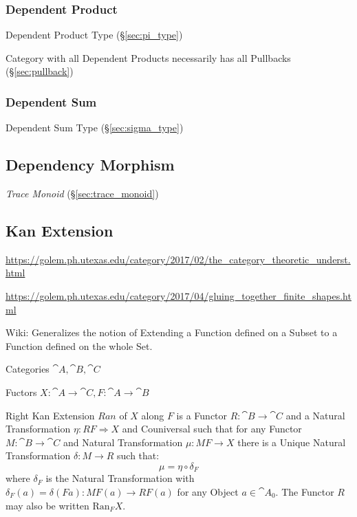 \subsubsection{Dependent Product}\label{sec:dependent_product}

Dependent Product Type (\S\ref{sec:pi_type})

Category with all Dependent Products necessarily has all Pullbacks
(\S\ref{sec:pullback})



\subsubsection{Dependent Sum}\label{sec:dependent_sum}

Dependent Sum Type (\S\ref{sec:sigma_type})



\subsection{Dependency Morphism}\label{sec:dependency_morphism}

\emph{Trace Monoid} (\S\ref{sec:trace_monoid})



\subsection{Kan Extension}\label{sec:kan_extension}

\url{https://golem.ph.utexas.edu/category/2017/02/the_category_theoretic_underst.html}

\url{https://golem.ph.utexas.edu/category/2017/04/gluing_together_finite_shapes.html}

Wiki: Generalizes the notion of Extending a Function defined on a
Subset to a Function defined on the whole Set.

Categories $\cat{A}, \cat{B}, \cat{C}$

Fuctors $X : \cat{A} \rightarrow \cat{C}, F : \cat{A} \rightarrow
\cat{B}$

Right Kan Extension $Ran$ of $X$ along $F$ is a Functor $R : \cat{B}
\rightarrow \cat{C}$ and a Natural Transformation $\eta : RF
\Rightarrow X$ and Couniversal such that for any Functor $M : \cat{B}
\rightarrow \cat{C}$ and Natural Transformation $\mu : MF \rightarrow
X$ there is a Unique Natural Transformation $\delta : M \rightarrow R$
such that:
\[
  \mu = \eta \circ \delta_F
\]
where $\delta_F$ is the Natural Transformation with $\delta_F(a) =
\delta (F a) : M F(a) \rightarrow RF(a)$ for any Object $a \in
\cat{A}_0$. The Functor $R$ may also be written $\mathrm{Ran}_F X$.

